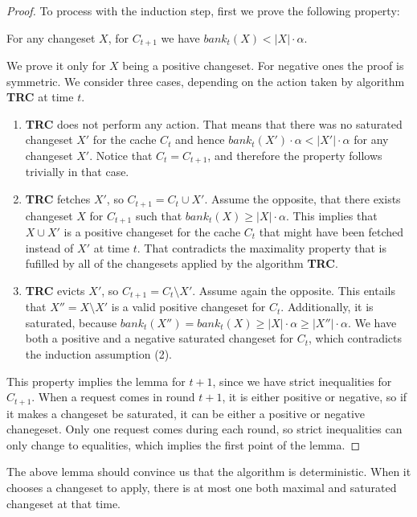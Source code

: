 \begin{proof}
To process with the induction step, first we prove the following property:
\begin{property} For any changeset $X$, for $C_{t+1}$ we have $bank_t(X) < |X|
\cdot \alpha$.  \end{property} We prove it only for $X$ being a positive
changeset. For negative ones the proof is symmetric. We consider three cases,
depending on the action taken by algorithm \textbf{TRC} at time $t$.
\begin{enumerate} \item \textbf{TRC} does not perform any action. That means
that there was no saturated changeset $X'$ for the cache $C_t$ and hence
$bank_t(X') \cdot \alpha < |X'| \cdot \alpha$ for any changeset $X'$. Notice 
that $C_t = C_{t+1}$, and therefore the property follows trivially in that case.  \item
\textbf{TRC} fetches $X'$, so $C_{t+1} = C_t \cup X'$. Assume the opposite, that
there exists changeset $X$ for $C_{t+1}$ such that $bank_t(X) \geq |X| \cdot
\alpha$. This implies that $X \cup X'$ is a positive changeset for the cache
$C_t$ that might have been fetched instead of $X'$ at time $t$. That
contradicts the maximality property that is fufilled by all of the changesets
applied by the algorithm \textbf{TRC}.  \item \textbf{TRC} evicts $X'$, so
$C_{t+1} = C_t \setminus X'$. Assume again the opposite. This entails that
$X'' = X \setminus X'$ is a valid positive changeset for $C_t$. Additionally, it
is saturated, because $bank_t(X'') = bank_t(X) \geq |X| \cdot \alpha \geq |X''|
\cdot \alpha$. We have both a positive and a negative saturated changeset for
$C_t$, which contradicts the induction assumption (2).  \end{enumerate} This
property implies the lemma for $t+1$, since we have strict inequalities for
$C_{t+1}$. When a request comes in round $t+1$, it is either positive or negative,
so if it makes a changeset be saturated, it can be either a positive or negative
chanegeset. Only one request comes during each round, so strict inequalities
can only change to equalities, which implies the first point of the lemma.
\end{proof} The above lemma should convince us that the algorithm is
deterministic. When it chooses a changeset to apply, there is at most one both
maximal and saturated changeset at that time.

